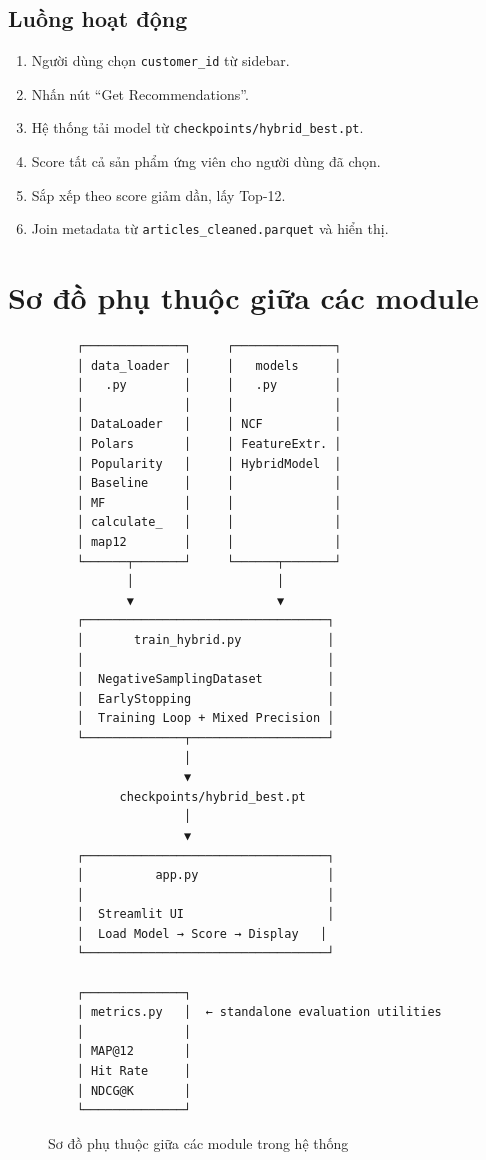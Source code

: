 \documentclass[12pt,a4paper]{article}
\begin{document}
\subsection{Luồng hoạt động}

\begin{enumerate}[leftmargin=2em]
    \item Người dùng chọn \texttt{customer\_id} từ sidebar.
    \item Nhấn nút ``Get Recommendations''.
    \item Hệ thống tải model từ \texttt{checkpoints/hybrid\_best.pt}.
    \item Score tất cả sản phẩm ứng viên cho người dùng đã chọn.
    \item Sắp xếp theo score giảm dần, lấy Top-12.
    \item Join metadata từ \texttt{articles\_cleaned.parquet} và hiển thị.
\end{enumerate}

\section{Sơ đồ phụ thuộc giữa các module}

\begin{figure}[H]
\centering
\begin{verbatim}
    ┌──────────────┐     ┌──────────────┐
    │ data_loader  │     │   models     │
    │   .py        │     │   .py        │
    │              │     │              │
    │ DataLoader   │     │ NCF          │
    │ Polars       │     │ FeatureExtr. │
    │ Popularity   │     │ HybridModel  │
    │ Baseline     │     │              │
    │ MF           │     │              │
    │ calculate_   │     │              │
    │ map12        │     │              │
    └──────┬───────┘     └──────┬───────┘
           │                    │
           ▼                    ▼
    ┌──────────────────────────────────┐
    │       train_hybrid.py            │
    │                                  │
    │  NegativeSamplingDataset         │
    │  EarlyStopping                   │
    │  Training Loop + Mixed Precision │
    └──────────────┬───────────────────┘
                   │
                   ▼
          checkpoints/hybrid_best.pt
                   │
                   ▼
    ┌──────────────────────────────────┐
    │          app.py                  │
    │                                  │
    │  Streamlit UI                    │
    │  Load Model → Score → Display   │
    └──────────────────────────────────┘

    ┌──────────────┐
    │ metrics.py   │  ← standalone evaluation utilities
    │              │
    │ MAP@12       │
    │ Hit Rate     │
    │ NDCG@K       │
    └──────────────┘
\end{verbatim}
\caption{Sơ đồ phụ thuộc giữa các module trong hệ thống}
\end{figure}
\end{document}
